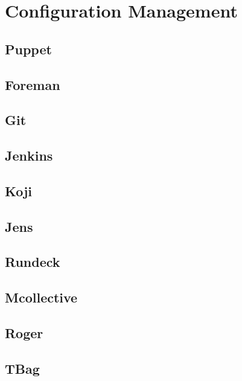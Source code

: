 \section{Configuration Management}

\subsection{Puppet}
\subsection{Foreman}
\subsection{Git}
\subsection{Jenkins}
\subsection{Koji}
\subsection{Jens}
\subsection{Rundeck}
\subsection{Mcollective}
\subsection{Roger}
\subsection{TBag}

